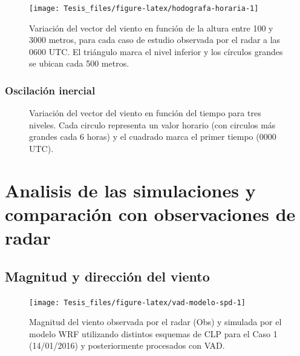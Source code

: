 \documentclass[12pt,spanish,oneside]{book}
\begin{document}
\begin{figure}

{\centering \texttt{[image: Tesis\_files/figure-latex/hodografa-horaria-1]} 

}

\caption{Variación del vector del viento en función de la altura entre 100 y 3000 metros, para cada caso de estudio observada por el radar a las 0600 UTC. El triángulo marca el nivel inferior y los círculos grandes se ubican cada 500 metros. \label{hodografa-h}}\label{fig:hodografa-horaria}
\end{figure}

\subsubsection{Oscilación inercial}\label{oscilacion-inercial}

\begin{figure}

{\centering {}\newline{}

}

\caption{Variación del vector del viento en función del tiempo para tres niveles. Cada circulo representa un valor horario (con circulos más grandes cada 6 horas) y el cuadrado marca el primer tiempo (0000 UTC). \label{hodografa-n}}\label{fig:hodografa-nivel}
\end{figure}

\section{Analisis de las simulaciones y comparación con observaciones de
radar}\label{analisis-de-las-simulaciones-y-comparacion-con-observaciones-de-radar}

\subsection{Magnitud y dirección del
viento}\label{magnitud-y-direccion-del-viento}

\begin{figure}

{\centering \texttt{[image: Tesis\_files/figure-latex/vad-modelo-spd-1]} 

}

\caption{Magnitud del viento observada por el radar (Obs) y simulada por el modelo WRF utilizando distintos esquemas de CLP para el Caso 1 (14/01/2016) y posteriormente procesados con VAD. \label{modelo-spd}}\label{fig:vad-modelo-spd}
\end{figure}
\end{document}
